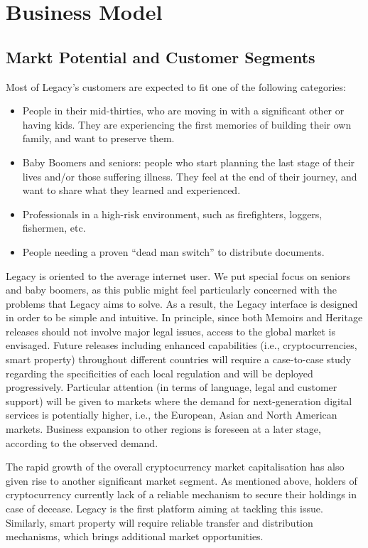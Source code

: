\chapter{Business Model} %
\label{cha:business_model}


\section{Markt Potential and Customer Segments} %
\label{sec:markt_potential_and_customer_segments}
Most of Legacy’s customers are expected to fit one of the following categories:
\begin{itemize}
	\item People in their mid-thirties, who are moving in with a significant other or having kids. They are experiencing the first memories of building their own family, and want to preserve them.
	\item Baby Boomers and seniors: people who start planning the last stage of their lives and/or those suffering illness. They feel at the end of their journey, and want to share what they learned and experienced.
	\item Professionals in a high-risk environment, such as firefighters, loggers, fishermen, etc.
	\item People needing a proven “dead man switch” to distribute documents.
\end{itemize}

Legacy is oriented to the average internet user. We put special focus on seniors  and baby boomers, as this public might feel particularly concerned with the problems that Legacy aims to solve. As a result, the Legacy interface is designed in order to be simple and intuitive. In principle, since both Memoirs and Heritage releases should not involve major legal issues, access to the global market is envisaged. Future releases including enhanced capabilities (i.e., cryptocurrencies, smart property) throughout different countries will require a case-to-case study regarding the specificities of each local regulation and will be deployed progressively. Particular attention (in terms of language, legal and customer support) will be given to markets where the demand for next-generation digital services is potentially higher, i.e., the European, Asian and North American markets. Business expansion to other regions is foreseen at a later stage, according to the observed demand.  

The rapid growth of the overall cryptocurrency market capitalisation has also given rise to another significant market segment. As mentioned above, holders of cryptocurrency currently lack of a reliable mechanism to secure their holdings in case of decease. Legacy is the first platform aiming at tackling this issue. Similarly, smart property will require reliable transfer and distribution mechanisms, which brings additional market opportunities. 

